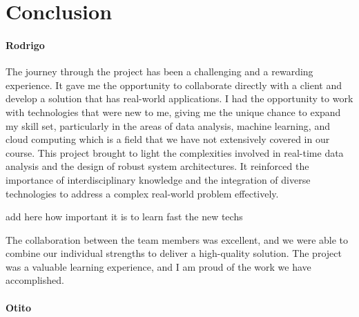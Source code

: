 \chapter{Conclusion}


\subsubsection*{Rodrigo}

The journey through the project has been a challenging and a rewarding experience. It gave me the opportunity to collaborate directly with a client and develop 
a solution that has real-world applications. I had the opportunity to work with technologies that were new to me, giving me the unique chance to expand my skill 
set, particularly in the areas of data analysis, machine learning, and cloud computing which is a field that we have not extensively covered in our course.  
This project brought to light the complexities involved in real-time data analysis and the design of robust system architectures. It reinforced the
importance of interdisciplinary knowledge and the integration of diverse technologies to address a complex real-world problem effectively. 

add here how important it is to learn fast the new techs


The collaboration between the team members was excellent, and we were able to combine our individual strengths to deliver a high-quality solution. 
The project was a valuable learning experience, and I am proud of the work we have accomplished.



\subsubsection*{Otito}